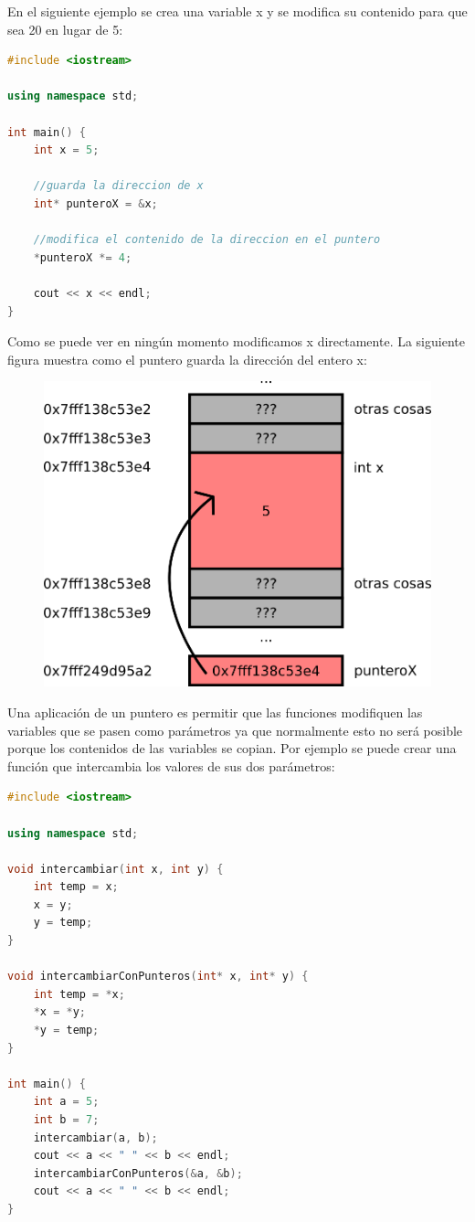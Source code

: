 \documentclass{article}
\begin{document}
En el siguiente ejemplo se crea una variable x y se modifica su contenido para que sea 20 en lugar de 5:

\begin{lstlisting}[language=C++, caption=Referencias]
#include <iostream>

using namespace std;

int main() {
    int x = 5;

    //guarda la direccion de x
    int* punteroX = &x;

    //modifica el contenido de la direccion en el puntero
    *punteroX *= 4;

    cout << x << endl;
}
\end{lstlisting}

Como se puede ver en ningún momento modificamos x directamente. La siguiente figura muestra como el puntero guarda la dirección del entero x:

\begin{figure}[H]
    \centering
    \includegraphics[width=0.4\paperwidth]{puntero}
\end{figure}

Una aplicación de un puntero es permitir que las funciones modifiquen las variables que se pasen como parámetros ya que normalmente esto no será posible porque los contenidos de las variables se copian. Por ejemplo se puede crear una función que intercambia los valores de sus dos parámetros:

\begin{lstlisting}[language=C++, caption=Funciones con punteros]
#include <iostream>

using namespace std;

void intercambiar(int x, int y) {
    int temp = x;
    x = y;
    y = temp;
}

void intercambiarConPunteros(int* x, int* y) {
    int temp = *x;
    *x = *y;
    *y = temp;
}

int main() {
    int a = 5;
    int b = 7;
    intercambiar(a, b);
    cout << a << " " << b << endl;
    intercambiarConPunteros(&a, &b);
    cout << a << " " << b << endl;
}
\end{lstlisting}
\end{document}
